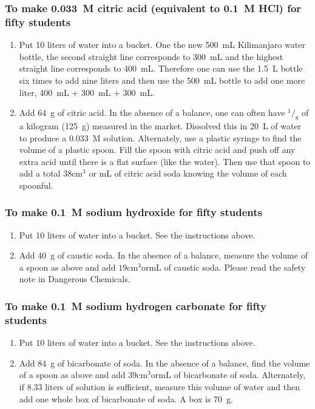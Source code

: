 \subsubsection{To make 0.033~M citric acid (equivalent to 0.1~M HCl) for fifty students}
\begin{enumerate}
\item{Put 10 liters of water into a bucket. One the new 500~mL Kilimanjaro water bottle, the second straight line corresponds to 300~mL and the highest straight line corresponds to 400~mL. Therefore one can use the 1.5~L bottle six times to add nine liters and then use the 500~mL bottle to add one more liter, 400~mL + 300~mL + 300~mL.}
\item{Add 64~g of citric acid. In the absence of a balance, one can often have $^1/_8$ of a kilogram (125~g) measured in the market. Dissolved this in 20~L of water to produce a 0.033~M solution. Alternately, use a plastic syringe to find the volume of a plastic spoon. Fill the spoon with citric acid and push off any extra acid until there is a flat surface (like the water). Then use that spoon to add a total $38 \mathrm{cm}^3$ or mL of citric acid soda knowing the volume of each spoonful.}
\end{enumerate}

\subsubsection{To make 0.1~M sodium hydroxide for fifty students}
\begin{enumerate}
\item{Put 10 liters of water into a bucket. See the instructions above.}
\item{Add 40~g of caustic soda. In the absence of a balance, measure the volume of a spoon as above and add $19 \mathrm{cm}^3 \mathrm{or mL}$ of caustic soda. Please read the safety note in Dangerous Chemicals.}
\end{enumerate}

\subsubsection{To make 0.1~M sodium hydrogen carbonate for fifty students}
\begin{enumerate}
\item{Put 10 liters of water into a bucket. See the instructions above.}
\item{Add 84~g of bicarbonate of soda. In the absence of a balance, find the volume of a spoon as above and add $39 \mathrm{cm}^3 \mathrm{or mL}$ of bicarbonate of soda. Alternately, if 8.33 liters of solution is sufficient, measure this volume of water and then add one whole box of bicarbonate of soda. A box is 70~g.}
\end{enumerate}

